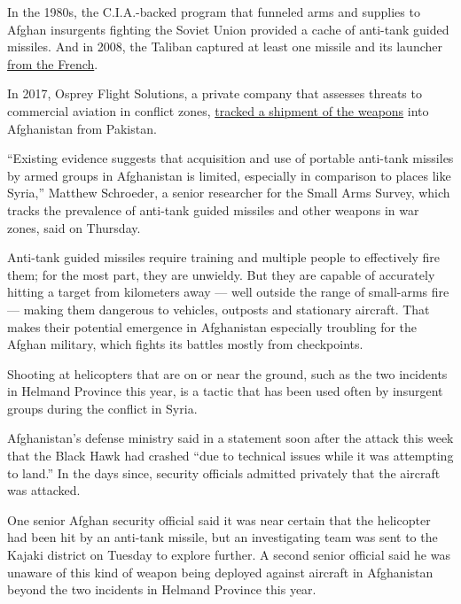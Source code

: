 In the 1980s, the C.I.A.-backed program that funneled arms and supplies
to Afghan insurgents fighting the Soviet Union provided a cache of
anti-tank guided missiles. And in 2008, the Taliban captured at least
one missile and its launcher
\href{https://www.dailystar.com.lb//News/Middle-East/2008/Oct-25/76596-france-plays-down-capture-of-anti-tank-missiles-by-taliban.ashx}{from
the French}.

In 2017, Osprey Flight Solutions, a private company that assesses
threats to commercial aviation in conflict zones,
\href{https://s3-eu-west-1.amazonaws.com/osprey-system-alerts/alert-472-2017-11-10.pdf}{tracked
a shipment of the weapons} into Afghanistan from Pakistan.

``Existing evidence suggests that acquisition and use of portable
anti-tank missiles by armed groups in Afghanistan is limited, especially
in comparison to places like Syria,'' Matthew Schroeder, a senior
researcher for the Small Arms Survey, which tracks the prevalence of
anti-tank guided missiles and other weapons in war zones, said on
Thursday.

Anti-tank guided missiles require training and multiple people to
effectively fire them; for the most part, they are unwieldy. But they
are capable of accurately hitting a target from kilometers away --- well
outside the range of small-arms fire --- making them dangerous to
vehicles, outposts and stationary aircraft. That makes their potential
emergence in Afghanistan especially troubling for the Afghan military,
which fights its battles mostly from checkpoints.

Shooting at helicopters that are on or near the ground, such as the two
incidents in Helmand Province this year, is a tactic that has been used
often by insurgent groups during the conflict in Syria.

Afghanistan's defense ministry said in a statement soon after the attack
this week that the Black Hawk had crashed ``due to technical issues
while it was attempting to land.'' In the days since, security officials
admitted privately that the aircraft was attacked.

One senior Afghan security official said it was near certain that the
helicopter had been hit by an anti-tank missile, but an investigating
team was sent to the Kajaki district on Tuesday to explore further. A
second senior official said he was unaware of this kind of weapon being
deployed against aircraft in Afghanistan beyond the two incidents in
Helmand Province this year.

